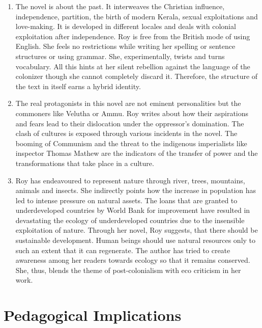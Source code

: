 \begin{enumerate}
  \item The novel is about the past. It interweaves the Christian influence, independence, partition, the birth of modern Kerala, sexual exploitations and love-making. It is developed in different locales and deals with colonial exploitation after independence. Roy is free from the British mode of using English. She feels no restrictions while writing her spelling or sentence structures or using grammar. She, experimentally, twists and turns vocabulary. All this hints at her silent rebellion against the language of the colonizer though she cannot completely discard it. Therefore, the structure of the text in itself earns a hybrid identity.

  \item The real protagonists in this novel are not eminent personalities but the commoners like Velutha or Ammu. Roy writes about how their aspirations and fears lead to their dislocation under the oppressor's domination. The clash of cultures is exposed through various incidents in the novel. The booming of Communism and the threat to the indigenous imperialists like inspector Thomas Mathew are the indicators of the transfer of power and the transformations that take place in a culture.

  \item Roy has endeavoured to represent nature through river, trees, mountains, animals and insects. She indirectly points how the increase in population has led to intense pressure on natural assets. The loans that are granted to underdeveloped countries by World Bank for improvement have resulted in devastating the ecology of underdeveloped countries due to the insensible exploitation of nature. Through her novel, Roy suggests, that there should be sustainable development. Human beings should use natural resources only to such an extent that it can regenerate. The author has tried to create awareness among her readers towards ecology so that it remains conserved. She, thus, blends the theme of post-colonialism with eco criticism in her work.
\end{enumerate}

\section{Pedagogical Implications}

